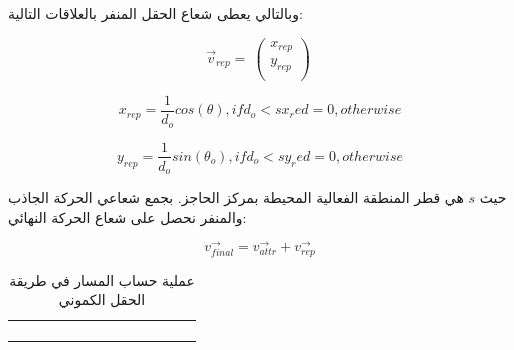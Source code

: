 وبالتالي يعطى شعاع الحقل المنفر بالعلاقات التالية:

\begin{equation}
{\vec{v}}_{rep}=\ (\begin{matrix}x_{rep}\\y_{rep}\\\end{matrix})\ 
\end{equation}

\begin{equation}
x_{rep}=\frac{1}{d_o} cos(\theta), if d_o < s
x_red = 0 , otherwise  
\end{equation}

\begin{equation}
y_{rep}=\frac{1}{d_o} sin(\theta_o), if d_o < s
y_red = 0 , otherwise  
\end{equation}


حيث $ s $ هي قطر المنطقة الفعالية المحيطة بمركز الحاجز.
بجمع شعاعي الحركة الجاذب والمنفر نحصل على شعاع الحركة النهائي:

\begin{equation}
v_{final}^\rightarrow=v_{attr}^\rightarrow+v_{rep}^\rightarrow
\end{equation}

\begin{table}
	\centering
	\begin{tabular}{cc}
		
		\begin{subfigure}{0.35\textwidth}
			\centering
			
		\end{subfigure}&
		
		\begin{subfigure}{0.35\textwidth}
			\centering
			
		\end{subfigure}
	\end{tabular}
	\caption{عملية حساب المسار في طريقة الحقل الكموني}
	\label{10:fig:pf}
\end{table}


